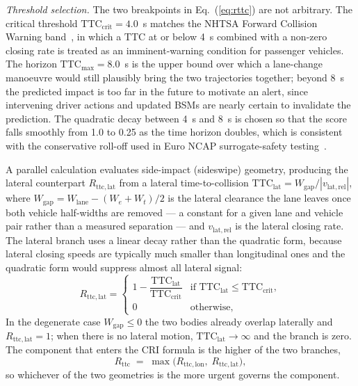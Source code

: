 \documentclass[sn-mathphys-num,Numbered,iicol]{sn-jnl}
\begin{document}
\medskip\noindent
\emph{Threshold selection.} The two breakpoints in Eq.~(\ref{eq:rttc}) are not arbitrary. The critical threshold $\mathrm{TTC}_{\mathrm{crit}} = 4.0$~s matches the NHTSA Forward Collision Warning band~\cite{nhtsa_fcw2013}, in which a $\mathrm{TTC}$ at or below 4~s combined with a non-zero closing rate is treated as an imminent-warning condition for passenger vehicles. The horizon $\mathrm{TTC}_{\max} = 8.0$~s is the upper bound over which a lane-change manoeuvre would still plausibly bring the two trajectories together; beyond 8~s the predicted impact is too far in the future to motivate an alert, since intervening driver actions and updated BSMs are nearly certain to invalidate the prediction. The quadratic decay between 4~s and 8~s is chosen so that the score falls smoothly from 1.0 to 0.25 as the time horizon doubles, which is consistent with the conservative roll-off used in Euro NCAP surrogate-safety testing~\cite{euroncap2019}.

\medskip\noindent
A parallel calculation evaluates side-impact (sideswipe) geometry, producing the lateral counterpart $R_{\mathrm{ttc,lat}}$ from a lateral time-to-collision $\mathrm{TTC}_{\mathrm{lat}} = W_{\mathrm{gap}}/|v_{\mathrm{lat,rel}}|$, where $W_{\mathrm{gap}} = W_{\mathrm{lane}} - (W_e + W_t)/2$ is the lateral clearance the lane leaves once both vehicle half-widths are removed --- a constant for a given lane and vehicle pair rather than a measured separation --- and $v_{\mathrm{lat,rel}}$ is the lateral closing rate. The lateral branch uses a linear decay rather than the quadratic form, because lateral closing speeds are typically much smaller than longitudinal ones and the quadratic form would suppress almost all lateral signal:
\begin{equation*}
  R_{\mathrm{ttc,lat}} =
  \begin{cases}
    1 - \dfrac{\mathrm{TTC}_{\mathrm{lat}}}{\mathrm{TTC}_{\mathrm{crit}}}
      & \text{if } \mathrm{TTC}_{\mathrm{lat}} \le \mathrm{TTC}_{\mathrm{crit}}, \\[8pt]
    0 & \text{otherwise},
  \end{cases}
\end{equation*}
In the degenerate case $W_{\mathrm{gap}} \le 0$ the two bodies already overlap laterally and $R_{\mathrm{ttc,lat}} = 1$; when there is no lateral motion, $\mathrm{TTC}_{\mathrm{lat}} \to \infty$ and the branch is zero. The component that enters the CRI formula is the higher of the two branches,
\begin{equation}
  R_{\mathrm{ttc}} \;=\; \max\bigl(R_{\mathrm{ttc,lon}},\; R_{\mathrm{ttc,lat}}\bigr),
\end{equation}
so whichever of the two geometries is the more urgent governs the component.
\end{document}
